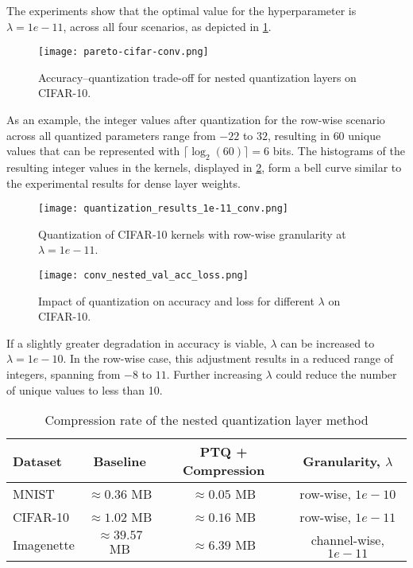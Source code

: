 The experiments show that the optimal value for the hyperparameter is \( \lambda = 1e-11\),
across all four scenarios, as depicted in \cref{fig:pareto-cifar-conv}.
\begin{figure}[b!]
  \centering
  \texttt{[image: pareto-cifar-conv.png]}
  \caption{Accuracy–quantization trade-off for nested quantization layers on CIFAR-10.}
  \label{fig:pareto-cifar-conv}
\end{figure}
As an example, the integer values after quantization for the row-wise scenario across
all quantized parameters range from \( -22 \) to \( 32 \), 
resulting in \( 60 \) unique values that can be represented with \( \lceil \log_2(60) \rceil = 6 \) bits.
The histograms of the resulting integer values in the kernels, displayed in \cref{fig:quantization-results-1e-10conv},
form a bell curve similar to the experimental results for dense layer weights.
\begin{figure}[t!]
  \centering
  \texttt{[image: quantization\_results\_1e-11\_conv.png]}
  \caption{Quantization of CIFAR-10 kernels with row-wise granularity at  \( \lambda  = 1e-11 \).}
  \label{fig:quantization-results-1e-10conv}
\end{figure}
\begin{figure}[t!]
  \centering
  \texttt{[image: conv\_nested\_val\_acc\_loss.png]}
  \caption{Impact of quantization on accuracy and loss for different \( \lambda \) on CIFAR-10.}
  \label{fig:val-accs-over-epochs-conv}
\end{figure}
If a slightly greater degradation in accuracy is viable, 
\( \lambda \) can be increased to \( \lambda = 1e-10\).
In the row-wise case, this adjustment results in a reduced range of integers,
spanning from \( -8 \) to \( 11 \). Further increasing \( \lambda \) could
reduce the number of unique values to less than 10.

\begin{table}[b!]
  \centering
  \caption{Compression rate of the nested quantization layer method}
  \label{tab:nestedcomrpessionrate}
  \begin{tabular}{lccc}
      \toprule
      \textbf{Dataset}     & \textbf{Baseline} & \textbf{PTQ + Compression} & \textbf{Granularity, $\lambda$} \\ 
      \midrule
      MNIST                & $\approx 0.36 $ MB            & $\approx 0.05 $ MB              & row-wise, $1e-10$         \\ 
      CIFAR-10          &  $\approx 1.02 $ MB          & $\approx 0.16 $ MB            & row-wise, $1e-11$            \\ 
      Imagenette               &  $\approx 39.57 $ MB          & $\approx 6.39 $ MB             & channel-wise, $1e-11$          \\ 

      \bottomrule
  \end{tabular}
  \vspace{0.5em}
\end{table}


